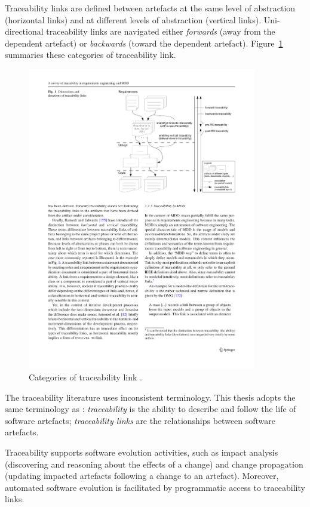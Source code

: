 Traceability links are defined between artefacts at the same level of abstraction (horizontal links) and at different levels of abstraction (vertical links). Uni-directional traceability links are navigated either \emph{forwards} (away from the dependent artefact) or \emph{backwards} (toward the dependent artefact). Figure~\ref{fig:traceability_links} summaries these categories of traceability link.

\begin{figure}[htbp]
  \begin{center}
    \leavevmode
    \includegraphics[width=10cm]{3.LiteratureReview/images/traceability_links.pdf}
  \end{center}
  \caption{Categories of traceability link \cite{winkler09survey}.}
  \label{fig:traceability_links}
\end{figure}

The traceability literature uses inconsistent terminology. This thesis adopts the same terminology as \cite{winkler09survey}: \emph{traceability} is the ability to describe and follow the life of software artefacts; \emph{traceability links} are the relationships between software artefacts.

Traceability supports software evolution activities, such as impact analysis (discovering and reasoning about the effects of a change) and change propagation (updating impacted artefacts following a change to an artefact). Moreover, automated software evolution is facilitated by programmatic access to traceability links.

